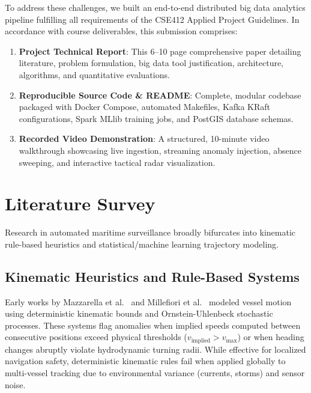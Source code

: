 \documentclass[10pt,twocolumn,a4paper]{article}
\begin{document}
To address these challenges, we built an end-to-end distributed big data analytics pipeline fulfilling all requirements of the CSE412 Applied Project Guidelines. In accordance with course deliverables, this submission comprises:
\begin{enumerate}[leftmargin=*]
    \item \textbf{Project Technical Report}: This 6--10 page comprehensive paper detailing literature, problem formulation, big data tool justification, architecture, algorithms, and quantitative evaluations.
    \item \textbf{Reproducible Source Code \& README}: Complete, modular codebase packaged with Docker Compose, automated Makefiles, Kafka KRaft configurations, Spark MLlib training jobs, and PostGIS database schemas.
    \item \textbf{Recorded Video Demonstration}: A structured, 10-minute video walkthrough showcasing live ingestion, streaming anomaly injection, absence sweeping, and interactive tactical radar visualization.
\end{enumerate}

\section{Literature Survey}
\label{sec:literature}

Research in automated maritime surveillance broadly bifurcates into kinematic rule-based heuristics and statistical/machine learning trajectory modeling.

\subsection{Kinematic Heuristics and Rule-Based Systems}
Early works by Mazzarella et al.~\cite{pelich2019mapping} and Millefiori et al.~\cite{millefiori2016modeling} modeled vessel motion using deterministic kinematic bounds and Ornstein-Uhlenbeck stochastic processes. These systems flag anomalies when implied speeds computed between consecutive positions exceed physical thresholds ($v_{\text{implied}} > v_{\text{max}}$) or when heading changes abruptly violate hydrodynamic turning radii. While effective for localized navigation safety, deterministic kinematic rules fail when applied globally to multi-vessel tracking due to environmental variance (currents, storms) and sensor noise.
\end{document}
